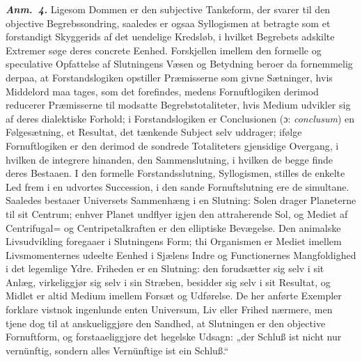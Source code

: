 \documentclass[12pt]{book}
\newcommand{\anm}[1]{\emph{\textbf{Anm.~#1.}}}
\newcommand{\dsi}{\textup{ɔ:}}
\newcommand{\opage}[1]{\marginnote{\footnotesize\textit{[#1]}}}
\begin{document}
\anm{4} Ligesom Dommen er den subjective Tankeform, der svarer til den objective
Begrebssondring, saaledes er ogsaa Syllogismen at betragte som et forstandigt
Skyggerids af det uendelige Kredsløb, i hvilket Begrebets adskilte Extremer søge
deres concrete Eenhed. Forskjellen imellem den formelle og speculative Opfattelse af
Slutningens Væsen og Betydning beroer da fornemmelig derpaa, at Forstandslogiken
opstiller Præmisserne som givne Sætninger, hvis Middelord maa tages, som det
forefindes, medens Fornuftlogiken derimod reducerer Præmisserne til modsatte
Begrebstotaliteter, hvis Medium udvikler sig af deres dialektiske Forhold; i
Forstandslogiken er Conclusionen (\dsi{} \textit{conclusum}) en Følgesætning, et
Resultat, det tænkende Subject selv uddrager; ifølge Fornuftlogiken er den derimod
de sondrede Totaliteters gjensidige Overgang, i hvilken de integrere hinanden, den
Sammenslutning, i hvilken de begge finde deres Bestaaen. I den formelle
Forstandsslutning, Syllogismen, stilles de enkelte Led frem i en udvortes
Succession, i den sande Fornuftslutning ere de simultane. Saaledes bestaaer
Universets Sammenhæng i en Slutning: Solen drager Planeterne til sit Centrum;
enhver Planet undflyer igjen den attraherende Sol, og Mediet af Centrifugal= og
Centripetalkraften er den elliptiske Bevægelse. Den animalske Livsudvikling
foregaaer
\opage{73} i Slutningens Form; thi Organismen er Mediet imellem Livsmomenternes udeelte Eenhed
i Sjælens Indre og Functionernes Mangfoldighed i det legemlige Ydre. Friheden er en
Slutning: den forudsætter sig selv i sit Anlæg, virkeliggjør sig selv i sin Stræben,
besidder sig selv i sit Resultat, og Midlet er altid Medium imellem Forsæt og
Udførelse. De her anførte Exempler forklare vistnok ingenlunde enten Universum, Liv
eller Frihed nærmere, men tjene dog til at anskueliggjøre den Sandhed, at Slutningen
er den objective Fornuftform, og forstaaeliggjøre det hegelske Udsagn: „der Schluß
ist nicht nur vernünftig, sondern alles Vernünftige ist ein Schluß.“
\end{document}

